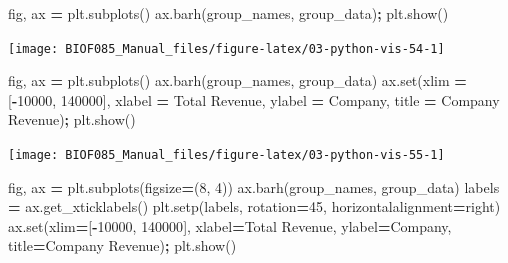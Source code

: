 \documentclass[
  letterpaper,
]{scrbook}
\newenvironment{Shaded}{\begin{snugshade}}{\end{snugshade}}
\newcommand{\BuiltInTok}[1]{#1}
\newcommand{\DecValTok}[1]{\textcolor[rgb]{0.00,0.00,0.81}{#1}}
\newcommand{\NormalTok}[1]{#1}
\newcommand{\OperatorTok}[1]{\textcolor[rgb]{0.81,0.36,0.00}{\textbf{#1}}}
\newcommand{\StringTok}[1]{\textcolor[rgb]{0.31,0.60,0.02}{#1}}
\begin{document}
\begin{Shaded}
\begin{Highlighting}[]
\NormalTok{fig, ax }\OperatorTok{=}\NormalTok{ plt.subplots()}
\NormalTok{ax.barh(group\_names, group\_data)}\OperatorTok{;}
\NormalTok{plt.show()}
\end{Highlighting}
\end{Shaded}

\begin{center}\texttt{[image: BIOF085\_Manual\_files/figure-latex/03-python-vis-54-1]} \end{center}

\begin{Shaded}
\begin{Highlighting}[]
\NormalTok{fig, ax }\OperatorTok{=}\NormalTok{ plt.subplots()}
\NormalTok{ax.barh(group\_names, group\_data)}
\NormalTok{ax.}\BuiltInTok{set}\NormalTok{(xlim }\OperatorTok{=}\NormalTok{ [}\OperatorTok{{-}}\DecValTok{10000}\NormalTok{, }\DecValTok{140000}\NormalTok{], xlabel }\OperatorTok{=} \StringTok{\textquotesingle{}Total Revenue\textquotesingle{}}\NormalTok{, ylabel }\OperatorTok{=} \StringTok{\textquotesingle{}Company\textquotesingle{}}\NormalTok{, }
\NormalTok{       title }\OperatorTok{=} \StringTok{\textquotesingle{}Company Revenue\textquotesingle{}}\NormalTok{)}\OperatorTok{;}
\NormalTok{plt.show()}
\end{Highlighting}
\end{Shaded}

\begin{center}\texttt{[image: BIOF085\_Manual\_files/figure-latex/03-python-vis-55-1]} \end{center}

\begin{Shaded}
\begin{Highlighting}[]
\NormalTok{fig, ax }\OperatorTok{=}\NormalTok{ plt.subplots(figsize}\OperatorTok{=}\NormalTok{(}\DecValTok{8}\NormalTok{, }\DecValTok{4}\NormalTok{))}
\NormalTok{ax.barh(group\_names, group\_data)}
\NormalTok{labels }\OperatorTok{=}\NormalTok{ ax.get\_xticklabels()}
\NormalTok{plt.setp(labels, rotation}\OperatorTok{=}\DecValTok{45}\NormalTok{, horizontalalignment}\OperatorTok{=}\StringTok{\textquotesingle{}right\textquotesingle{}}\NormalTok{)}
\NormalTok{ax.}\BuiltInTok{set}\NormalTok{(xlim}\OperatorTok{=}\NormalTok{[}\OperatorTok{{-}}\DecValTok{10000}\NormalTok{, }\DecValTok{140000}\NormalTok{], xlabel}\OperatorTok{=}\StringTok{\textquotesingle{}Total Revenue\textquotesingle{}}\NormalTok{, ylabel}\OperatorTok{=}\StringTok{\textquotesingle{}Company\textquotesingle{}}\NormalTok{,}
\NormalTok{       title}\OperatorTok{=}\StringTok{\textquotesingle{}Company Revenue\textquotesingle{}}\NormalTok{)}\OperatorTok{;}
\NormalTok{plt.show()}
\end{Highlighting}
\end{Shaded}
\end{document}
